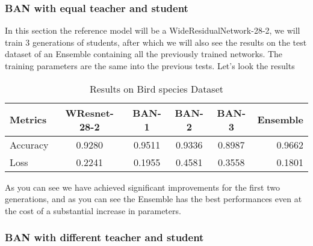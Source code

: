 \subsubsection{BAN with equal teacher and student}
In this section the reference model will be a WideResidualNetwork-28-2, we will train 3 generations of students, after which we will also see the results on the test dataset of an Ensemble containing all the previously trained networks. The training parameters are the same into the previous tests. Let's look the results
\begin{table}[h!]
  \begin{center}
    \caption{Results on Bird species Dataset}
    \begin{tabular}{l|c|c|c|c|r} 
      \textbf{Metrics} & \textbf{WResnet-28-2} & \textbf{BAN-1} & \textbf{BAN-2} & \textbf{BAN-3} & \textbf{Ensemble}\\ 
      \hline
      Accuracy & 0.9280 & 0.9511 & 0.9336 & 0.8987 & 0.9662\\
      Loss & 0.2241 & 0.1955 & 0.4581 & 0.3558 & 0.1801\\

    \end{tabular}
  \end{center}
\end{table}

As you can see we have achieved significant improvements for the first two generations, and as you can see the Ensemble has the best performances even at the cost of a substantial increase in parameters.
\subsubsection{BAN with different teacher and student}
